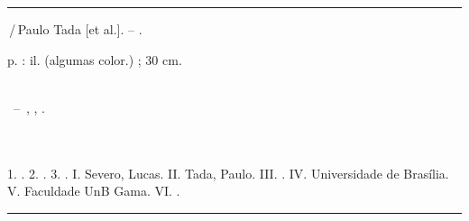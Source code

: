 \begin{fichacatalografica}
	\vspace*{\fill}					%
	\hrule							%
	\begin{center}					%
	\begin{minipage}[c]{12.5cm}		%

	\imprimirautorunico

	\hspace{0.5cm} \imprimirtitulo\,/\,Paulo Tada [et al.]. -- \imprimirdata.

	\hspace{0.5cm} \pageref{LastPage} p. : il. (algumas color.) ; 30 cm.\\

	\hspace{0.5cm} \imprimirorientadorRotulo~\imprimirorientador\\

	\hspace{0.5cm}
	\parbox[t]{\textwidth}{\imprimirtipotrabalho~--~\imprimirinstituicao, \imprimirlocal, \imprimirdata.}\\\\

	\hspace{0.5cm}
		1. \imprimirpalavrachaveum.
		2. \imprimirpalavrachavedois.
		3. \imprimirpalavrachavetres.
		I. Severo, Lucas.
		II. Tada, Paulo.
		III. \imprimirorientador.
		IV. Universidade de Brasília.
		V. Faculdade UnB Gama.
		VI. \imprimirtitulo.\\
	\end{minipage}
	\end{center}
	\hrule
\end{fichacatalografica}
\clearpage
